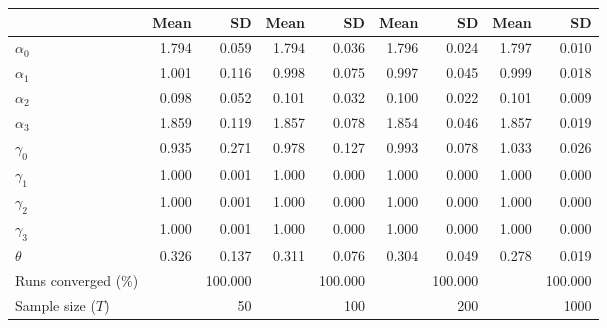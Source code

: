 
\begin{tabular}[t]{lrrrrrrrr}
\toprule
  & Mean & SD & Mean  & SD  & Mean   & SD   & Mean    & SD   \\
\midrule
$\alpha_{0}$ & 1.794 & 0.059 & 1.794 & 0.036 & 1.796 & 0.024 & 1.797 & 0.010\\
$\alpha_{1}$ & 1.001 & 0.116 & 0.998 & 0.075 & 0.997 & 0.045 & 0.999 & 0.018\\
$\alpha_{2}$ & 0.098 & 0.052 & 0.101 & 0.032 & 0.100 & 0.022 & 0.101 & 0.009\\
$\alpha_{3}$ & 1.859 & 0.119 & 1.857 & 0.078 & 1.854 & 0.046 & 1.857 & 0.019\\
$\gamma_{0}$ & 0.935 & 0.271 & 0.978 & 0.127 & 0.993 & 0.078 & 1.033 & 0.026\\
$\gamma_{1}$ & 1.000 & 0.001 & 1.000 & 0.000 & 1.000 & 0.000 & 1.000 & 0.000\\
$\gamma_{2}$ & 1.000 & 0.001 & 1.000 & 0.000 & 1.000 & 0.000 & 1.000 & 0.000\\
$\gamma_{3}$ & 1.000 & 0.001 & 1.000 & 0.000 & 1.000 & 0.000 & 1.000 & 0.000\\
$\theta$ & 0.326 & 0.137 & 0.311 & 0.076 & 0.304 & 0.049 & 0.278 & 0.019\\
Runs converged (\%) &  & 100.000 &  & 100.000 &  & 100.000 &  & 100.000\\
Sample size ($T$) &  & 50 &  & 100 &  & 200 &  & 1000\\
\bottomrule
\end{tabular}
